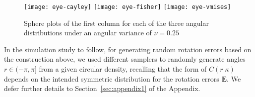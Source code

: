 \begin{figure}[htbp]
\texttt{[image: eye-cayley]}
\texttt{[image: eye-fisher]}
\texttt{[image: eye-vmises]}
\caption{\label{eyeballs}Sphere plots of the first column for each of the three angular distributions under an angular variance of  $\nu = 0.25$}
\end{figure}



\noindent In the simulation study to follow, for generating random rotation errors based on the construction above, we used different samplers to randomly generate angles $r\in(-\pi,\pi]$ from a given circular density, recalling that the form of $C(r|\kappa)$ depends on the intended symmetric distribution for the rotation errors $\bm{E}$.  We defer further details to Section~\ref{sec:appendix1} of the Appendix.




